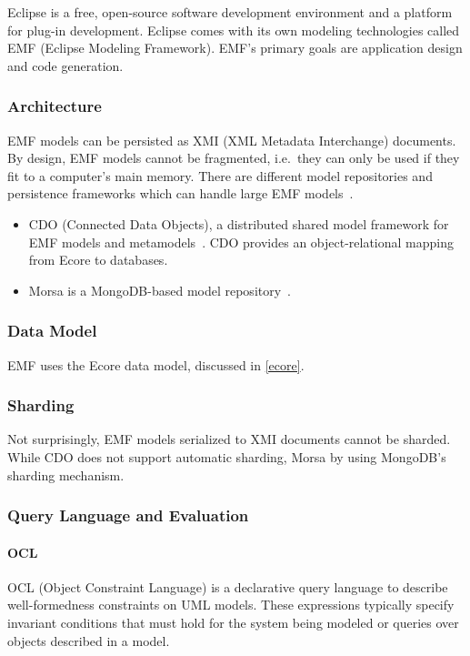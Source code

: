 Eclipse is a free, open-source software development environment and a platform for plug-in development. Eclipse comes with its own modeling technologies called EMF (Eclipse Modeling Framework). EMF's primary goals are application design and code generation.

\subsubsection{Architecture}

EMF models can be persisted as XMI (XML Metadata Interchange) documents. By design, EMF models cannot be fragmented, i.e.\ they can only be used if they fit to a computer's main memory. There are different model repositories and persistence frameworks which can handle large EMF models~\cite{Scheidgen:2012:ATM:2404962.2404974}. 

\begin{itemize}
  \item CDO (Connected Data Objects), a distributed shared model framework for EMF models and metamodels~\cite{CDO}. CDO provides an object-relational mapping from Ecore to databases.
  \item Morsa is a MongoDB-based model repository~\cite{Pagan:2011:MSA:2050655.2050665}.
\end{itemize}
 
\subsubsection{Data Model}

EMF uses the Ecore data model, discussed in \autoref{ecore}. 

\subsubsection{Sharding}

Not surprisingly, EMF models serialized to XMI documents cannot be sharded. While CDO does not support automatic sharding, Morsa by using MongoDB's sharding mechanism.

\subsubsection{Query Language and Evaluation}
\label{emf-query-language}

\paragraph{OCL} OCL (Object Constraint Language) is a declarative query language %
to describe well-formedness constraints on UML models. These expressions typically specify invariant conditions that must hold for the system being modeled or queries over objects described in a model. %

